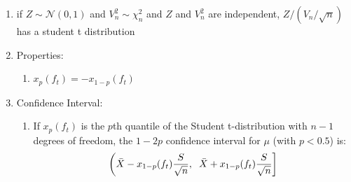 \begin{enumerate}
    \item if $Z \sim \mathcal{N}(0,1)$ and $V_n^2 \sim \chi_n^2$ and $Z$ and $V_n^2$ are independent, $Z/(V_n/\sqrt{n})$ has a student t distribution

    \item Properties:
    \begin{enumerate}
        \item $x_p(f_t) = -x_{1-p}(f_t)$

    \end{enumerate}

    \item Confidence Interval:
    \begin{enumerate}
        \item If $x_p(f_t)$ is the $p$th quantile of the Student t-distribution with $n - 1$ degrees of freedom, the $1 - 2p$ confidence interval for $\mu$ (with $p < 0.5$) is:
        \[\left(
            \bar{X} - x_{1-p}(f_t)\dfrac{S}{\sqrt{n}},
            \hspace{0.2cm}
            \bar{X} + x_{1-p}(f_t)\dfrac{S}{\sqrt{n}}
        \right]\]

    \end{enumerate}

\end{enumerate}




















































